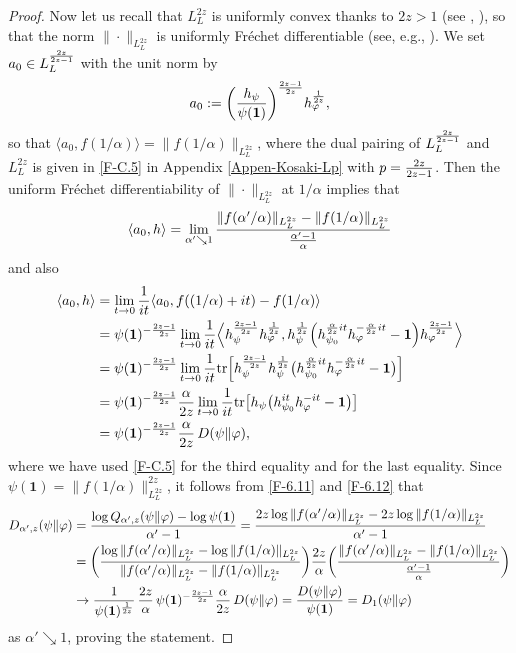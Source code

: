 \documentclass[12pt]{article}
\theoremstyle{definition}
\theoremstyle{remark}
\numberwithin{equation}{section}
\def\Tr{\mathrm{tr}}
\def\<{\langle}
\def\>{\rangle}
\def\ffi{\varphi}
\def\1{\mathbf{1}}
\begin{document}
\begin{proof}
Now let us recall that $L^{2z}_L$ is uniformly convex thanks to $2z>1$ (see \cite{haagerup1979lpspaces},
\cite[Theorem 4.2]{kosaki1984applications}), so that the norm $\|\cdot\|_{L^{2z}_L}$ is uniformly Fr\'echet
differentiable (see, e.g., \cite[Part 3, Chap.~II]{beauzamy1982introduction}). We set
$a_0\in L^{2z\over2z-1}_L$ with the unit norm by
\[
a_0:=\biggl({h_\psi\over\psi(\1)}\biggr)^{2z-1\over2z}h_\ffi^{1\over2z},
\]
so that $\<a_0,f(1/\alpha)\>=\|f(1/\alpha)\|_{L^{2z}_L}$, where the dual pairing of $L^{2z\over2z-1}_L$
and $L^{2z}_L$ is given in \eqref{F-C.5} in Appendix \ref{Appen-Kosaki-Lp} with $p={2z\over2z-1}$. Then
the uniform Fr\'echet differentiability of $\|\cdot\|_{L^{2z}_L}$ at $1/\alpha$ implies that
\begin{align}\label{F-6.11}
\<a_0,h\>=\lim_{\alpha'\searrow1}{\|f(\alpha'/\alpha)\|_{L^{2z}_L}-\|f(1/\alpha)\|_{L^{2z}_L}
\over{\alpha'-1\over\alpha}}
\end{align}
and also
\begin{align}
\<a_0,h\>&=\lim_{t\to0}{1\over it}\<a_0,f((1/\alpha)+it)-f(1/\alpha)\> \nonumber\\
&=\psi(\1)^{-{2z-1\over2z}}\lim_{t\to0}{1\over it}\Bigl\<h_\psi^{2z-1\over2z}h_\ffi^{1\over2z},
h_\psi^{1\over2z}\Bigl(h_{\psi_0}^{{\alpha\over2z}it}h_\ffi^{-{\alpha\over2z}it}-\1\Bigr)
h_\ffi^{2z-1\over2z}\Bigr\> \nonumber\\
&=\psi(\1)^{-{2z-1\over2z}}\lim_{t\to0}{1\over it}\Tr\Bigl[h_\psi^{2z-1\over2z}h_\psi^{1\over2z}
\bigl(h_{\psi_0}^{{\alpha\over2z}it}h_\ffi^{-{\alpha\over2z}it}-\1\bigr)\Bigr] \nonumber\\
&=\psi(\1)^{-{2z-1\over2z}}{\alpha\over2z}
\lim_{t\to0}{1\over it}\Tr\bigl[h_\psi\bigl(h_{\psi_0}^{it}h_\ffi^{-it}-\1\bigr)\bigr] \nonumber\\
&=\psi(\1)^{-{2z-1\over2z}}{\alpha\over2z}\,D(\psi\|\ffi), \label{F-6.12}
\end{align}
where we have used \eqref{F-C.5} for the third equality and \cite[Theorem 5.7]{ohya1993quantum}
for the last equality. Since $\psi(\1)=\|f(1/\alpha)\|_{L^{2z}_L}^{2z}$, it follows from \eqref{F-6.11} and
\eqref{F-6.12} that
\begin{align*}
D_{\alpha',z}(\psi\|\ffi)
&={\log Q_{\alpha',z}(\psi\|\ffi)-\log\psi(\1)\over\alpha'-1}
={2z\log\|f(\alpha'/\alpha)\|_{L^{2z}_L}-2z\log\|f(1/\alpha)\|_{L^{2z}_L}\over\alpha'-1} \\
&=\biggl({\log\|f(\alpha'/\alpha)\|_{L^{2z}_L}-\log\|f(1/\alpha)\|_{L^{2z}_L}\over
\|f(\alpha'/\alpha)\|_{L^{2z}_L}-\|f(1/\alpha)\|_{L^{2z}_L}}\biggr)
{2z\over\alpha}\biggl({\|f(\alpha'/\alpha)\|_{L^{2z}_L}-\|f(1/\alpha)\|_{L^{2z}_L}\over
{\alpha'-1\over\alpha}}\biggr) \\
&\to{1\over\psi(\1)^{1\over2z}}\,{2z\over\alpha}\,\psi(\1)^{-{2z-1\over2z}}{\alpha\over2z}\,D(\psi\|\ffi)
={D(\psi\|\ffi)\over\psi(\1)}=D_1(\psi\|\ffi)
\end{align*}
as $\alpha'\searrow1$, proving the statement.
\end{proof}
\end{document}
